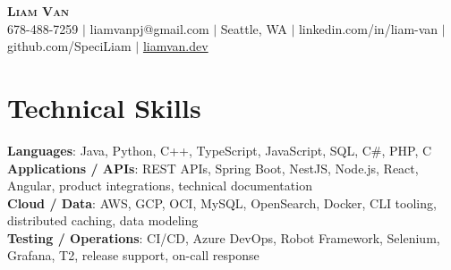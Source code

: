 \documentclass[letterpaper,11pt]{article}
\begin{document}

%
\begin{center}
    \textbf{\Huge \scshape Liam Van} \\ \vspace{1pt}
    \small 678-488-7259 $|$ \small {liamvanpj@gmail.com} $|$ Seattle, WA
 {{$|$ linkedin.com/in/liam-van} {$|$ github.com/SpeciLiam} {$|$ \href{https://liamvan.dev}{liamvan.dev}}}

\end{center}

\section{Technical Skills}
 \begin{itemize}[leftmargin=0.15in, label={}]
    \small{\item{
     \textbf{Languages}{: Java, Python, C++, TypeScript, JavaScript, SQL, C\#, PHP, C} \\
     \textbf{Applications / APIs}{: REST APIs, Spring Boot, NestJS, Node.js, React, Angular, product integrations, technical documentation} \\
     \textbf{Cloud / Data}{: AWS, GCP, OCI, MySQL, OpenSearch, Docker, CLI tooling, distributed caching, data modeling} \\
     \textbf{Testing / Operations}{: CI/CD, Azure DevOps, Robot Framework, Selenium, Grafana, T2, release support, on-call response} \\
    }}
 \end{itemize}
%
\end{document}
